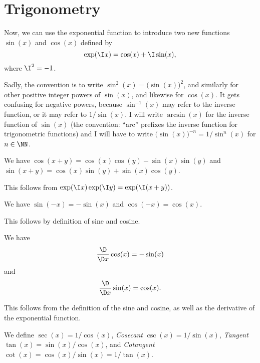 
\section{Trigonometry}

\begin{node}[Trigonometry]\label{calculus-000S}%
Now, we can use the exponential function  to
introduce two new functions $\sin(x)$ and $\cos(x)$ defined by
\[\exp(\I x)=\cos(x)+\I\sin(x),\]
where $\I^{2}=-1$.

\begin{node}[Conventions]\label{calculus-000X}%
Sadly, the convention is to write $\sin^{2}(x)=\bigl(\sin(x)\bigr)^{2}$,
and similarly for other positive integer powers of $\sin(x)$, and
likewise for $\cos(x)$. It gets confusing for negative powers, because
$\sin^{-1}(x)$ may refer to the inverse function, or it may refer to
$1/\sin(x)$. I will write $\arcsin(x)$ for the inverse function of
$\sin(x)$ (the convention: ``arc'' prefixes the inverse function for
trigonometric functions) and I will have to write
$\bigl(\sin(x)\bigr)^{-n}=1/\sin^{n}(x)$ for $n\in\NN$.
\end{node}

\end{node} %

\begin{lemma}\label{calculus-000T}
We have $\cos(x+y)=\cos(x)\cos(y)-\sin(x)\sin(y)$ and $\sin(x+y)=\cos(x)\sin(y)+\sin(x)\cos(y)$.
\end{lemma}

This follows from $\exp(\I x)\exp(\I y)=\exp(\I(x+y))$.

\begin{lemma}\label{calculus-000Y}%
We have $\sin(-x)=-\sin(x)$ and $\cos(-x)=\cos(x)$.
\end{lemma}

This follows by definition of sine and cosine.

\begin{theorem}\label{calculus-000Z}%
  We have
  \[\frac{\D}{\D x}\cos(x)=-\sin(x)\]
  and
  \[\frac{\D}{\D x}\sin(x)=\cos(x).\]
\end{theorem}
This follows from the definition of the sine and cosine, as well as the
derivative of the exponential function.

\begin{definition}\label{calculus-0010}%
We define  $\sec(x)=1/\cos(x)$, \emph{Cosecant}
$\csc(x)=1/\sin(x)$, \emph{Tangent} $\tan(x)=\sin(x)/\cos(x)$, and
\emph{Cotangent} $\cot(x)=\cos(x)/\sin(x)=1/\tan(x)$.
\end{definition}

